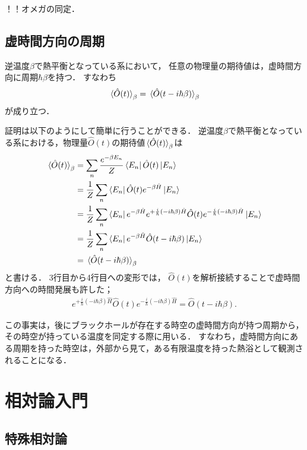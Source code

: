 \documentclass[uplatex,dvipdfmx]{vkaishi}
\begin{document}
！！オメガの同定．

\subsection{虚時間方向の周期}

逆温度$\beta$で熱平衡となっている系において，
任意の物理量の期待値は，虚時間方向に周期$\hbar\beta$を持つ．
すなわち
\begin{align}
  \expval*{\hat O(t)}_\beta
  = \expval*{\hat O(t - i\hbar\beta)}_\beta
  \label{eq:O-period}
\end{align}
が成り立つ．

証明は以下のようにして簡単に行うことができる．
逆温度$\beta$で熱平衡となっている系における，物理量$\hat O(t)$の期待値$\expval*{\hat O(t)}_\beta$は
\begin{align*}
  \expval*{\hat O(t)}_\beta
  &= \sum_n \frac{e^{-\beta E_n}}{Z} \bra{E_n} \hat O(t) \ket{E_n} \\
  &= \frac1Z \sum_n \bra{E_n} \hat O(t) e^{-\beta \hat H} \ket{E_n} \\
  &= \frac1Z \sum_n \bra{E_n} e^{-\beta \hat H} e^{+\frac{i}{\hbar}(-i\hbar\beta) \hat H} \hat O(t) e^{-\frac{i}{\hbar}(-i\hbar\beta) \hat H} \ket{E_n} \\
  &= \frac1Z \sum_n \bra{E_n} e^{-\beta \hat H} \hat O(t - i\hbar\beta) \ket{E_n} \\
    &= \expval*{\hat O(t - i\hbar\beta)}_\beta
\end{align*}
と書ける．
3行目から4行目への変形では，
$\hat O(t)$を解析接続することで虚時間方向への時間発展も許した；
\begin{align}
  e^{+\frac{i}{\hbar}(-i\hbar\beta) \hat H} \hat O(t) e^{-\frac{i}{\hbar}(-i\hbar\beta) \hat H}
  = \hat O(t - i\hbar\beta).
\end{align}
\QED

この事実は，後にブラックホールが存在する時空の虚時間方向が持つ周期から，その時空が持っている温度を同定する際に用いる．
すなわち，虚時間方向にある周期を持った時空は，外部から見て，ある有限温度を持った熱浴として観測されることになる．


\section{相対論入門}

\subsection{特殊相対論}
\end{document}
